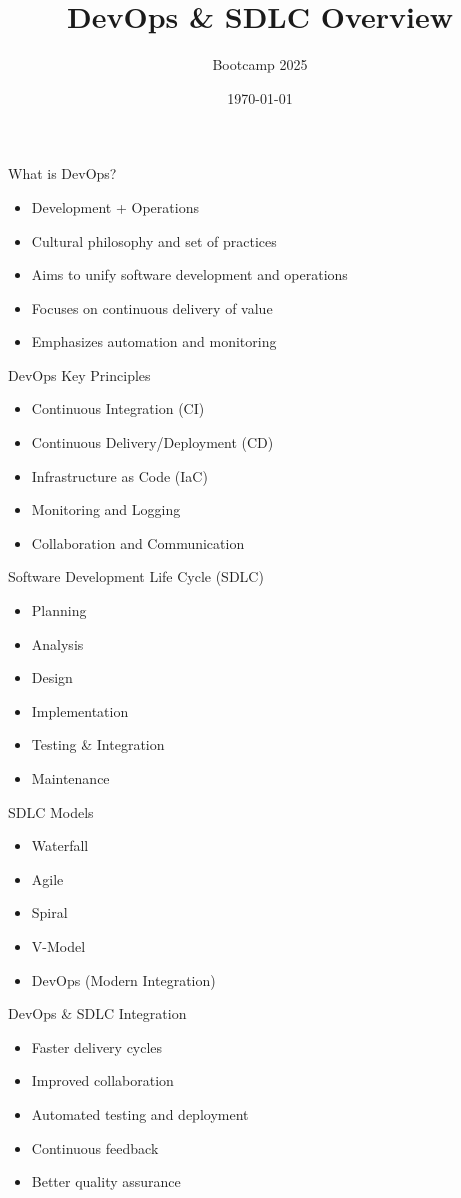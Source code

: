 \documentclass{beamer}
\title{DevOps \& SDLC Overview}
\author{Bootcamp 2025}
\date{\today}
\begin{document}
\begin{frame}
    \titlepage
\end{frame}

\begin{frame}{What is DevOps?}
    \begin{itemize}
        \item Development + Operations
        \item Cultural philosophy and set of practices
        \item Aims to unify software development and operations
        \item Focuses on continuous delivery of value
        \item Emphasizes automation and monitoring
    \end{itemize}
\end{frame}

\begin{frame}{DevOps Key Principles}
    \begin{itemize}
        \item Continuous Integration (CI)
        \item Continuous Delivery/Deployment (CD)
        \item Infrastructure as Code (IaC)
        \item Monitoring and Logging
        \item Collaboration and Communication
    \end{itemize}
\end{frame}

\begin{frame}{Software Development Life Cycle (SDLC)}
    \begin{itemize}
        \item Planning
        \item Analysis
        \item Design
        \item Implementation
        \item Testing \& Integration
        \item Maintenance
    \end{itemize}
\end{frame}

\begin{frame}{SDLC Models}
    \begin{itemize}
        \item Waterfall
        \item Agile
        \item Spiral
        \item V-Model
        \item DevOps (Modern Integration)
    \end{itemize}
\end{frame}

\begin{frame}{DevOps \& SDLC Integration}
    \begin{itemize}
        \item Faster delivery cycles
        \item Improved collaboration
        \item Automated testing and deployment
        \item Continuous feedback
        \item Better quality assurance
    \end{itemize}
\end{frame}
\end{document}
